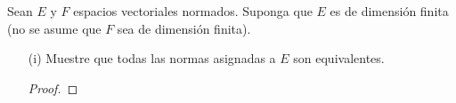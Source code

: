 Sean $E$ y $F$ espacios vectoriales normados. Suponga que $E$ es de dimensión finita (no se asume que $F$ sea de dimensión finita).

\begin{enumerate}
    \item[(i)] Muestre que todas las normas asignadas a $E$ son equivalentes.
    \begin{proof}








\end{proof}
\end{enumerate}
